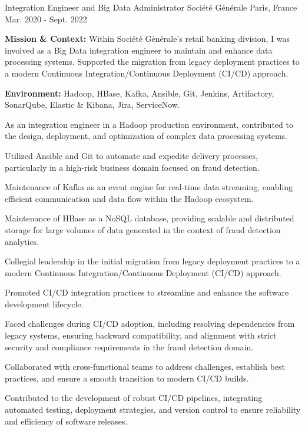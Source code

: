 \begin{cventries}
\cventry
{Integration Engineer and Big Data Administrator} %
{Société Générale} %
{Paris, France} %
{Mar. 2020 - Sept. 2022} %
{
  \begin{cvitems} %
    \item {\textbf{Mission \& Context:} Within Société Générale's retail banking division, I was involved as a Big Data integration engineer to maintain and enhance data processing systems. Supported the migration from legacy deployment practices to a modern Continuous Integration/Continuous Deployment (CI/CD) approach.}
    \item {\textbf{Environment:} Hadoop, HBase, Kafka, Ansible, Git, Jenkins, Artifactory, SonarQube, Elastic \& Kibana, Jira, ServiceNow.}
    \item {As an integration engineer in a Hadoop production environment, contributed to the design, deployment, and optimization of complex data processing systems.}
    \item {Utilized Ansible and Git to automate and expedite delivery processes, particularly in a high-risk business domain focused on fraud detection.}
    \item {Maintenance of Kafka as an event engine for real-time data streaming, enabling efficient communication and data flow within the Hadoop ecosystem.}
    \item {Maintenance of HBase as a NoSQL database, providing scalable and distributed storage for large volumes of data generated in the context of fraud detection analytics.}
    \item {Collegial leadership in the initial migration from legacy deployment practices to a modern Continuous Integration/Continuous Deployment (CI/CD) approach.}
    \item {Promoted CI/CD integration practices to streamline and enhance the software development lifecycle.}
    \item {Faced challenges during CI/CD adoption, including resolving dependencies from legacy systems, ensuring backward compatibility, and alignment with strict security and compliance requirements in the fraud detection domain.}
    \item {Collaborated with cross-functional teams to address challenges, establish best practices, and ensure a smooth transition to modern CI/CD builds.}
    \item {Contributed to the development of robust CI/CD pipelines, integrating automated testing, deployment strategies, and version control to ensure reliability and efficiency of software releases.}
  \end{cvitems}  
}


\end{cventries}
